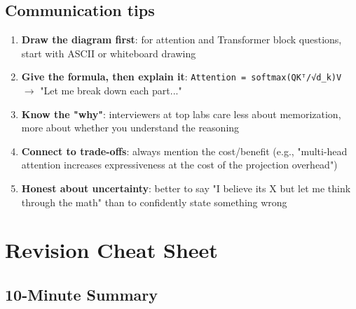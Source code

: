 \documentclass[11pt]{article}
\providecommand{\tightlist}{\setlength{\itemsep}{1pt}\setlength{\parskip}{0pt}}
\begin{document}
\subsection{Communication tips}\label{communication-tips}

\begin{enumerate}
\def\labelenumi{\arabic{enumi}.}
\tightlist
\item
  \textbf{Draw the diagram first}: for attention and Transformer block questions, start with ASCII or whiteboard drawing
\item
  \textbf{Give the formula, then explain it}: \texttt{Attention\ =\ softmax(QKᵀ/√d\_k)V} \(\rightarrow\) "Let me break down each part..."
\item
  \textbf{Know the "why"}: interviewers at top labs care less about memorization, more about whether you understand the reasoning
\item
  \textbf{Connect to trade-offs}: always mention the cost/benefit (e.g., "multi-head attention increases expressiveness at the cost of the projection overhead")
\item
  \textbf{Honest about uncertainty}: better to say "I believe it\textquotesingle s X but let me think through the math" than to confidently state something wrong
\end{enumerate}

\section{Revision Cheat Sheet}\label{revision-cheat-sheet}

\subsection{10-Minute Summary}\label{10-minute-summary}
\end{document}

